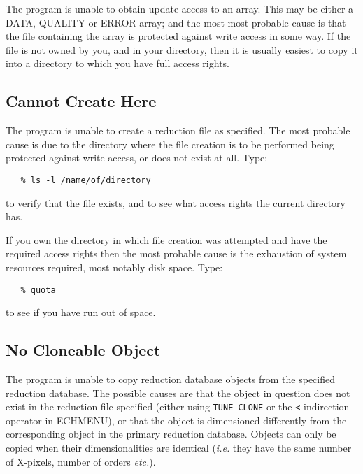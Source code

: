The program is unable to obtain update access to an array. This may be
either a DATA, QUALITY or ERROR array; and the most most probable cause
is that the file containing the array is protected against write access
in some way.  If the file is not owned by you, and in your directory,
then it is usually easiest to copy it into a directory to which you have
full access rights.


\subsection{ Cannot Create Here}

The program is unable to create a reduction file as specified. The most
probable cause is due to the directory where the file creation is to be
performed being protected against write access, or does not exist at
all. Type:

\begin{verbatim}
   % ls -l /name/of/directory
\end{verbatim}

to verify that the file exists, and to see what access rights the
current directory has.

If you own the directory in which file creation was attempted and have
the required access rights  then the most probable cause is the
exhaustion of system resources required, most notably disk space.
Type:

\begin{verbatim}
   % quota
\end{verbatim}

to see if you have run out of space.


\subsection{ No Cloneable Object}

The program is unable to copy reduction database objects from the
specified reduction database.  The possible causes are that the
object in question does not exist in the reduction file specified
(either using \verb+TUNE_CLONE+ or the \verb+<+ indirection operator in
ECHMENU), or that the object is dimensioned differently from the
corresponding object in the primary reduction database. Objects
can only be copied when their dimensionalities are identical ({\it{i.e.}} they
have the same number of X-pixels, number of orders {\it etc.}).

